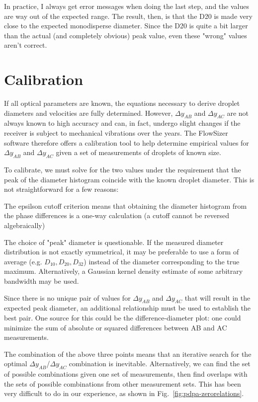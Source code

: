 \documentclass[11.5pt]{book}
\newcommand*{\figref}[1]{Fig.~\ref{#1}}
\begin{document}
In practice, I always get error messages when doing the last step, and the
values are way out of the expected range. The result, then, is that the D20 is
made very close to the expected monodisperse diameter. Since the D20 is quite
a bit larger than the actual (and completely obvious) peak value, even these
"wrong" values aren't correct.

\section{Calibration}
If all optical parameters are known, the equations necessary to derive droplet
diameters and velocities are fully determined. However, $\Delta y_{AB}$ and
$\Delta y_{AC}$ are not always known to high accuracy and can, in fact, undergo
slight changes if the receiver is subject to mechanical vibrations over the
years. The FlowSizer software therefore offers a calibration tool to help
determine empirical values for $\Delta y_{AB}$ and $\Delta y_{AC}$ given a set
of measurements of droplets of known size.

To calibrate, we must solve for the two values under the
requirement that the peak of the diameter histogram coincide with the known
droplet diameter. This is not straightforward for a few reasons:
\begin{alist}
\item The epsilson cutoff criterion means that obtaining the diameter histogram from
        the phase differences is a one-way calculation (a cutoff cannot be
        reversed algebraically)
\item The choice of "peak" diameter is questionable. If the measured diameter
        distribution is not exactly symmetrical, it may be preferable to use a
        form of average (e.g. $D_{10}, D_{20}, D_{32}$) instead of the diameter
        corresponding to the true maximum. Alternatively, a Gaussian kernel
        density estimate of some arbitrary bandwidth may be used.
\item Since there is no unique pair of values for $\Delta y_{AB}$ and $\Delta
        y_{AC}$ that will result in the expected peak diameter, an additional
        relationship must be used to establish the best pair. One source for
        this could be the difference-diameter plot: one could minimize the sum
        of absolute or squared differences between AB and AC measurements.
\end{alist}
The combination of the above three points means that an iterative search for the
optimal $\Delta y_{AB}$/$\Delta y_{AC}$ combination is inevitable.
Alternatively, we can find the set of possible combinations given one set of
measurements, then find overlaps with the sets of possible combinations from
other measurement sets. This has been very difficult to do in our experience, as
shown in \figref{fig:pdpa-zerorelations}.
\end{document}
